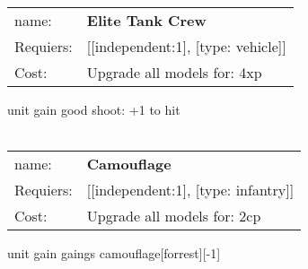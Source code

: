 \ \\
\begin{tabular}{ll}
name: & {\bf Elite Tank Crew } \\
Requiers: & [[independent:1], [type: vehicle]] \\
Cost: & Upgrade all models for: 4xp \\
\end{tabular}

unit gain good shoot: +1 to hit\\ 









\ \\
\begin{tabular}{ll}
name: & {\bf Camouflage } \\
Requiers: & [[independent:1], [type: infantry]] \\
Cost: & Upgrade all models for: 2cp \\
\end{tabular}

unit gain gaings camouflage[forrest][-1]\\ 









